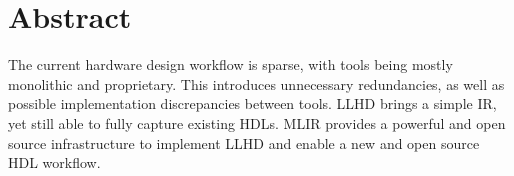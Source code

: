 


\begingroup
\let\clearpage\relax
\let\cleardoublepage\relax
\let\cleardoublepage\relax

\chapter*{Abstract}
The current hardware design workflow is sparse,  with tools being mostly monolithic and proprietary. This introduces unnecessary redundancies, as well as possible implementation discrepancies between tools. LLHD \cite{Schueki2020} brings a simple IR, yet still able to fully capture existing HDLs. MLIR \cite{Lattner2020} provides a powerful and open source infrastructure to implement LLHD and enable a new and open source HDL workflow.
\endgroup			

\vfill